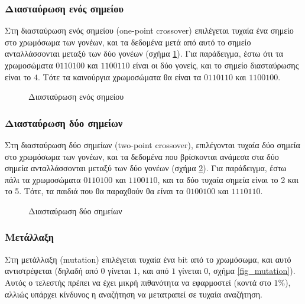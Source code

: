 \subsubsection{Διασταύρωση ενός σημείου}

Στη διασταύρωση ενός σημείου (one-point crossover) επιλέγεται τυχαία ένα σημείο στο χρωμόσωμα των γονέων, και τα δεδομένα μετά από αυτό το σημείο ανταλλάσσονται μεταξύ των δύο γονέων (σχήμα \ref{fig_opc}). Για παράδειγμα, έστω ότι τα χρωμοσώματα $0110100$ και $1100110$ είναι οι δύο γονείς, και το σημείο διασταύρωσης είναι το $4$. Τότε τα καινούργια χρωμοσώματα θα είναι τα $0110110$ και $1100100$.

\begin{figure}[!t]
    \centering
    \def\svgwidth{2.5in}
    
    \caption{Διασταύρωση ενός σημείου \cite{opc_fig}}
    \label{fig_opc}
\end{figure}

\subsubsection{Διασταύρωση δύο σημείων}

Στη διασταύρωση δύο σημείων (two-point crossover), επιλέγονται τυχαία δύο σημεία στο χρωμόσωμα των γονέων, και τα δεδομένα που βρίσκονται ανάμεσα στα δύο σημεία ανταλλάσσονται μεταξύ των δύο γονέων (σχήμα \ref{fig_tpc}). Για παράδειγμα, έστω πάλι τα χρωμοσώματα $0110100$ και $1100110$, και τα δύο τυχαία σημεία είναι το 2 και το 5. Τότε, τα παιδιά που θα παραχθούν θα είναι τα $0100100$ και $1110110$.

\begin{figure}[!t]
    \centering
    \def\svgwidth{2.5in}
    
    \caption{Διασταύρωση δύο σημείων \cite{tpc_fig}}
    \label{fig_tpc}
\end{figure}

\subsubsection{Μετάλλαξη}

Στη μετάλλαξη (mutation) επιλέγεται τυχαία ένα bit από το χρωμόσωμα, και αυτό αντιστρέφεται (δηλαδή από $0$ γίνεται $1$, και από $1$ γίνεται $0$, σχήμα \ref{fig_mutation}). Αυτός ο τελεστής πρέπει να έχει μικρή πιθανότητα να εφαρμοστεί (κοντά στο $1\%$), αλλιώς υπάρχει κίνδυνος η αναζήτηση να μετατραπεί σε τυχαία αναζήτηση. \cite{zotero-PNQJ3TKI}

